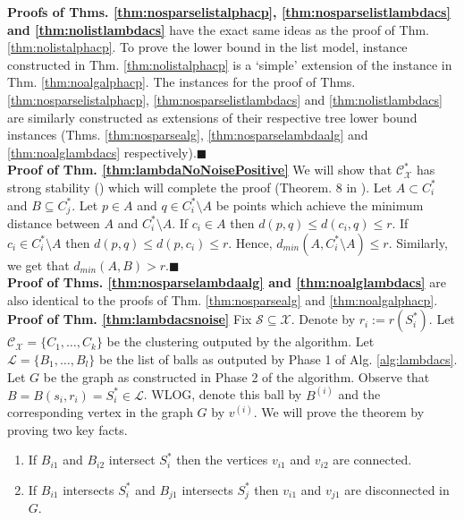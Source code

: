 \documentclass[orivec]{llncs}
\newcommand{\mc}{\mathcal}
\renewcommand{\qed}{\hfill\ensuremath{\blacksquare}}
\renewcommand\labelitemi{$\bullet$}
\begin{document}
\noindent\textbf{Proofs of Thms. \ref{thm:nosparselistalphacp}, \ref{thm:nosparselistlambdacs} and \ref{thm:nolistlambdacs}} have the exact same ideas as the proof of Thm. \ref{thm:nolistalphacp}. To prove the lower bound in the list model, instance constructed in Thm. \ref{thm:nolistalphacp} is a `simple' extension of the instance in Thm. \ref{thm:noalgalphacp}. The instances for the proof of Thms. \ref{thm:nosparselistalphacp}, \ref{thm:nosparselistlambdacs} and \ref{thm:nolistlambdacs} are similarly constructed as extensions of their respective tree lower bound instances (Thms. \ref{thm:nosparsealg}, \ref{thm:nosparselambdaalg} and \ref{thm:noalglambdacs} respectively).\qed\\

\noindent\textbf{Proof of Thm. \ref{thm:lambdaNoNoisePositive}}
We will show that $\mc C_{\mc X}^*$ has strong stability (\cite{balcan2008discriminative}) which will complete the proof (Theorem. 8 in \cite{balcan2008discriminative}). Let $A \subset C_i^*$ and $B \subseteq C_j^*$. Let $p \in A$ and $q \in C_i^* \setminus A$ be points which achieve the minimum distance between $A$ and $C_i^*\setminus A$. If $c_i \in A$ then $d(p, q) \le d(c_i, q) \le r$. If $c_i \in C_i^* \setminus A$ then $d(p, q) \le d(p, c_i) \le r$. Hence, $d_{min} (A, C_i^*\setminus A) \le r$. Similarly, we get that $d_{min}(A, B) > r$.\qed\\

\noindent\textbf{Proof of Thms. \ref{thm:nosparselambdaalg} and \ref{thm:noalglambdacs}} are also identical to the proofs of Thm. \ref{thm:nosparsealg} and \ref{thm:noalgalphacp}.\\

\noindent\textbf{Proof of Thm. \ref{thm:lambdacsnoise}}
Fix $\mc S \subseteq \mc X$. Denote by $r_i := r(S_i^*)$. Let $\mc C_{\mc X} = \{C_1, \ldots, C_k\}$ be the clustering outputed by the algorithm. Let $\mc L = \{B_1, \ldots, B_l\}$ be the list of balls as outputed by Phase 1 of Alg. \ref{alg:lambdacs}. Let $G$ be the graph as constructed in Phase 2 of the algorithm. Observe that $B = B(s_i, r_i) = S_i^* \in \mc L$. WLOG, denote this ball by $B^{(i)}$ and the corresponding vertex in the graph $G$ by $v^{(i)}$. We will prove the theorem by proving two key facts.  

\begin{enumerate}[nolistsep,noitemsep,label=\textbf{F.\arabic*},leftmargin=0.3in]
\renewcommand\labelitemi{$\diamond$}
\item \label{fact:lambda1} If $B_{i1}$ and $B_{i2}$ intersect $S_i^*$ then the vertices $v_{i1}$ and $v_{i2}$ are connected.
\item \label{fact:lambda2} If $B_{i1}$ intersects $S_i^*$ and $B_{j1}$ intersects $S_j^*$ then $v_{i1}$ and $v_{j1}$ are disconnected in $G$.	
\end{enumerate}
\end{document}
